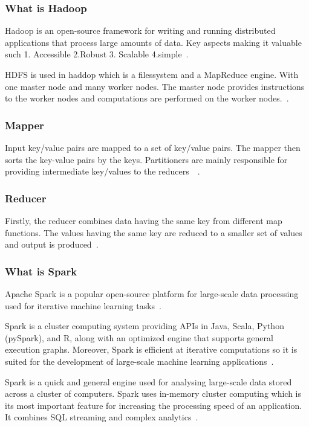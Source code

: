 \documentclass{report}
\begin{document}
\subsubsection{What is Hadoop}

Hadoop is an open-source framework for writing and running distributed applications that process large amounts of data.  Key aspects making it valuable such 1. Accessible 2.Robust 3. Scalable 4.simple~\cite{lam_hadoop_2010}.

HDFS is used in haddop which is a filessystem and a MapReduce engine. With one master node and many worker nodes. The master node provides instructions to the worker nodes and computations are performed on the worker nodes.~\cite{hazarika_performance_2017}.

\subsubsection{Mapper}
Input key/value pairs are mapped to a set of key/value pairs. The mapper then sorts the key-value pairs by the keys. Partitioners are mainly responsible for providing intermediate key/values to the reducers~\cite{patel_addressing_2012}~\cite{hazarika_performance_2017}.

\subsubsection{Reducer}

Firstly, the reducer combines data having the same key from different map functions. The values having the same key are reduced to a smaller set of values and output is produced~\cite{hazarika_performance_2017}.

\subsubsection{What is Spark}
Apache Spark is a popular open-source platform for large-scale data processing used for iterative machine learning tasks~\cite{meng_mllib_2016}.

Spark is a cluster computing system providing APIs in Java, Scala, Python (pySpark), and R, along with an optimized engine that supports general execution graphs. Moreover, Spark is efficient at iterative computations so it is suited for the development of large-scale machine learning applications~\cite{meng_mllib_2016}.

Spark is a quick and general engine used for analysing large-scale data stored across a cluster of computers. Spark uses in-memory cluster computing which is its most important feature for increasing the processing speed of an application. It combines SQL streaming and complex analytics~\cite{hazarika_performance_2017}.
\end{document}
